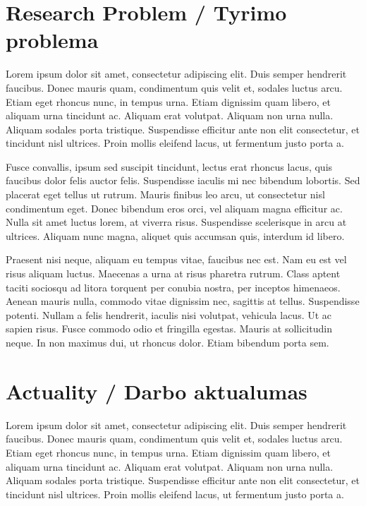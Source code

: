 \section*{Research Problem / Tyrimo problema}

Lorem ipsum dolor sit amet, consectetur adipiscing elit. Duis semper hendrerit faucibus. Donec mauris quam, condimentum quis velit et, sodales luctus arcu. Etiam eget rhoncus nunc, in tempus urna. Etiam dignissim quam libero, et aliquam urna tincidunt ac. Aliquam erat volutpat. Aliquam non urna nulla. Aliquam sodales porta tristique. Suspendisse efficitur ante non elit consectetur, et tincidunt nisl ultrices. Proin mollis eleifend lacus, ut fermentum justo porta a.

Fusce convallis, ipsum sed suscipit tincidunt, lectus erat rhoncus lacus, quis faucibus dolor felis auctor felis. Suspendisse iaculis mi nec bibendum lobortis. Sed placerat eget tellus ut rutrum. Mauris finibus leo arcu, ut consectetur nisl condimentum eget. Donec bibendum eros orci, vel aliquam magna efficitur ac. Nulla sit amet luctus lorem, at viverra risus. Suspendisse scelerisque in arcu at ultrices. Aliquam nunc magna, aliquet quis 
accumsan quis, interdum id libero.

Praesent nisi neque, aliquam eu tempus vitae, faucibus nec est. Nam eu est vel risus aliquam luctus. Maecenas a urna at risus pharetra rutrum. Class aptent taciti sociosqu ad litora torquent per conubia nostra, per inceptos himenaeos. Aenean mauris nulla, commodo vitae dignissim nec, sagittis at tellus. Suspendisse potenti. Nullam a felis hendrerit, iaculis nisi volutpat, vehicula lacus. Ut ac sapien risus. Fusce commodo odio et fringilla egestas. Mauris at sollicitudin neque. In non maximus dui, ut rhoncus dolor. Etiam bibendum porta sem.


\section*{Actuality / Darbo aktualumas}

Lorem ipsum dolor sit amet, consectetur adipiscing elit. Duis semper hendrerit faucibus. Donec mauris quam, condimentum quis velit et, sodales luctus arcu. Etiam eget rhoncus nunc, in tempus urna. Etiam dignissim quam libero, et aliquam urna tincidunt ac. Aliquam erat volutpat. Aliquam non urna nulla. Aliquam sodales porta tristique. Suspendisse efficitur ante non elit consectetur, et tincidunt nisl ultrices. Proin mollis eleifend lacus, ut fermentum justo porta a.


